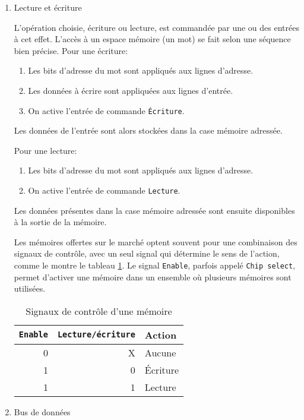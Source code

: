 \documentclass[letter, oneside]{book}
\begin{document}
\begin{enumerate}
\item Lecture et écriture
\label{sec:org110e828}

L'opération choisie, écriture ou lecture, est commandée par une ou des
entrées à cet effet. L'accès à un espace mémoire (un mot) se fait
selon une séquence bien précise. Pour une écriture:

\begin{enumerate}
\item Les bits d'adresse du mot sont appliqués aux lignes d'adresse.
\item Les données à écrire sont appliquées aux lignes d'entrée.
\item On active l'entrée de commande \texttt{Écriture}.
\end{enumerate}

Les données de l'entrée sont alors stockées dans la case mémoire adressée.

Pour une lecture:

\begin{enumerate}
\item Les bits d'adresse du mot sont appliqués aux lignes d'adresse.
\item On active l'entrée de commande \texttt{Lecture}.
\end{enumerate}

Les données présentes dans la case mémoire adressée sont ensuite
disponibles à la sortie de la mémoire.

Les mémoires offertes sur le marché optent souvent pour une
combinaison des signaux de contrôle, avec un seul signal qui détermine
le sens de l'action, comme le montre le tableau
\ref{tab:orgfa307e9}. Le signal \texttt{Enable}, parfois appelé \texttt{Chip
select}, permet d'activer une mémoire dans un ensemble où plusieurs
mémoires sont utilisées.

\begin{table}[htbp]
\caption{\label{tab:orgfa307e9}Signaux de contrôle d'une mémoire}
\centering
\begin{tabular}{rrl}
\texttt{Enable} & \texttt{Lecture/écriture} & Action\\[0pt]
\hline
0 & X & Aucune\\[0pt]
1 & 0 & Écriture\\[0pt]
1 & 1 & Lecture\\[0pt]
\end{tabular}
\end{table}

\item Bus de données
\label{sec:org525ab22}


\end{enumerate}
\end{document}
